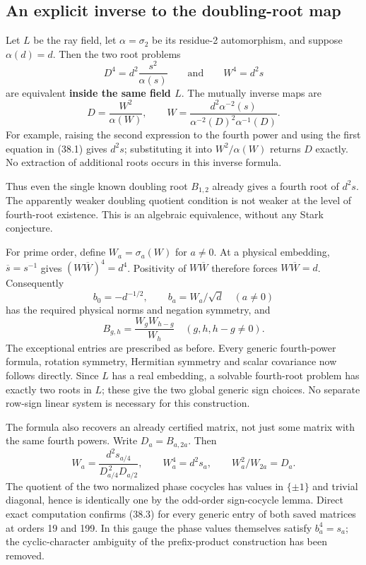 \documentclass[11pt,reqno]{amsart}
\theoremstyle{plain}
\begin{document}
\subsection{An explicit inverse to the doubling-root map}\label{sec:38.1}

Let \(L\) be the ray field, let \(\alpha=\sigma_2\) be its
residue-2 automorphism, and suppose \(\alpha(d)=d\). Then the two
root problems
\begin{equation*}
 D^4=d^2\frac{s^2}{\alpha(s)}
 \qquad\text{and}\qquad
 W^4=d^2s \tag{38.1}
\end{equation*}
are equivalent \textbf{inside the same field \(L\)}. The mutually inverse
maps are
\begin{equation*}
 \boxed{\quad D=\frac{W^2}{\alpha(W)},\qquad
 W=\frac{d^2\alpha^{-2}(s)}
          {\alpha^{-2}(D)^2\alpha^{-1}(D)}.\quad} \tag{38.2}
\end{equation*}
For example, raising the second expression to the fourth power and
using the first equation in (38.1) gives \(d^2s\); substituting it
into \(W^2/\alpha(W)\) returns \(D\) exactly. No extraction of
additional roots occurs in this inverse formula.

Thus even the single known doubling root \(B_{1,2}\) already gives
a fourth root of \(d^2s\). The apparently weaker doubling quotient
condition is not weaker at the level of fourth-root existence.
This is an algebraic equivalence, without any Stark conjecture.

For prime order, define \(W_a=\sigma_a(W)\) for \(a\ne0\).
At a physical embedding, \(\overline s=s^{-1}\) gives
\((W\overline W)^4=d^4\). Positivity of \(W\overline W\)
therefore forces \(W\overline W=d\). Consequently
\[
 b_0=-d^{-1/2},\qquad b_a=W_a/\sqrt d\quad(a\ne0)
\]
has the required physical norms and negation symmetry, and
\begin{equation*}
 \boxed{B_{g,h}=\frac{W_gW_{h-g}}{W_h}
 \quad(g,h,h-g\ne0).} \tag{38.3}
\end{equation*}
The exceptional entries are prescribed as before. Every generic
fourth-power formula, rotation symmetry, Hermitian symmetry and
scalar covariance now follows directly. Since \(L\) has a real
embedding, a solvable fourth-root problem has exactly two roots in
\(L\); these give the two global generic sign choices. No separate
row-sign linear system is necessary for this construction.

The formula also recovers an already certified matrix, not just some
matrix with the same fourth powers. Write \(D_a=B_{a,2a}\). Then
\[
 W_a=\frac{d^2s_{a/4}}{D_{a/4}^{\,2}D_{a/2}},
 \qquad W_a^4=d^2s_a,\qquad W_a^2/W_{2a}=D_a.
\]
The quotient of the two normalized phase cocycles has values in
\(\{\pm1\}\) and trivial diagonal, hence is identically one by
the odd-order sign-cocycle lemma. Direct exact computation confirms
(38.3) for every generic entry of both saved matrices at orders
19 and 199. In this gauge the phase values themselves satisfy
\(b_a^4=s_a\); the cyclic-character ambiguity of the prefix-product
construction has been removed.
\end{document}
